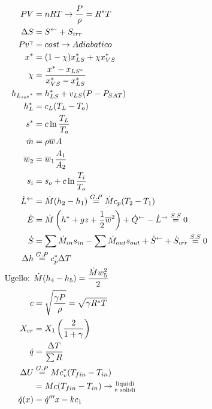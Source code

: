 \documentclass[twocolumn]{article}
\begin{document}
    \marginsize{1in}{1in}{.25in}{.25in}
    \pagestyle{empty}
    \onecolumn
    \begin{multicols}{2}
    \begin{align*}
        PV&= nRT \to \frac{P}{\rho}=R^{*} T\\
        \Delta S &= S^{\leftarrow}+S_{irr} \\
        Pv^{\gamma}&=cost \to Adiabatico\\
        x^{*} &= (1-\chi)x_{\small{LS}}^{*} + \chi x_{\small{VS}}^{*}  \\
        \chi &= \frac{x^{*} -x_{\small{LS}^{*} }}{x_{\small{VS}}^{*} -x_{\small{LS}}^{*} } \\
        h_{\small{L_{sat}}^{*} } &= h^{*} _{\small{LS}}+v_{\small{LS}}(P-P_{\small{SAT}}) \\
        h^{*} _{L} &= c_{\small{L}}(T_{L}-T_{o})\\
        s^{*} &= c\ln \frac{T_{\small{L}}}{T_{o}}\\
        \dot{m} &= \rho \overline{w}_{}A   \\
        \overline{w}_{2} &= \overline{w}_{1} \frac{A_{1}}{A_{2}} \\
        s_{i}&=s_{o} + c \ln \frac{T_{i}}{T_{o}}  \\
        \dot{L}^{\leftarrow} &= \dot{M}(h_{2}-h_{1})\stackrel{G.P}{=} \dot{M}c_{p}(T_{2}-T_{1})\\
        \dot{E}&=\dot{M}\left( h^{*} +gz+\frac{1}{2}\overline{w}_{}^{2}  \right)+\dot{Q}^{\leftarrow}-\dot{L}^{\to} \stackrel{S.S}{=} 0\\
        \dot{S} &= \sum\dot{M}_{in}s_{in}-\sum\dot{M}_{out}s_{out} + \dot{S}^{\leftarrow} + \dot{S}_{irr} \stackrel{S.S}{=} 0 \\
        \Delta h  &\stackrel{G.P}{=} c_{p}^{*} \Delta T \\
        \text{Ugello: }&\dot{M}(h_{4}-h_{5}) = \frac{\dot{M}w_{5}^{2}}{2} \\
        c &= \sqrt{ \frac{\gamma P}{\rho}} = \sqrt{ \gamma R^{*} T } \\
        X_{cr} &= X_{1}\left( \frac{2}{1+\gamma} \right)\\
        \dot{q} &= \frac{\Delta T}{\sum R}\\
        \Delta U &\stackrel{G.P}{=} Mc_{v}^{*} (T_{fin}-T_{in}) \\
        &= Mc(T_{fin}-T_{in})\to \substack{\text{liquidi}\\\text{e solidi}}\\
        \dot{q}(x) &= \dot{q}'''x-kc_{1}\\

\end{align*}
\end{multicols}
\end{document}
